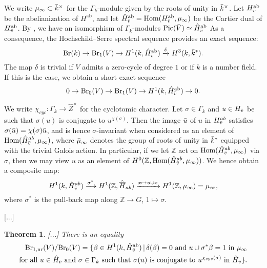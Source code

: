 \documentclass[10pt,letterpaper,twoside]{article}
\renewcommand{\1}{\mathbf{1}}
\newcommand{\nr}{\mathrm{nr}}
\newcommand{\Br}{\mathrm{Br}}
\theoremstyle{plain}
\newtheorem{theorem}{Theorem}[section]
\theoremstyle{plain}
\theoremstyle{definition}
\theoremstyle{named}
\theoremstyle{definition}
\begin{document}
	We write $\mu_{\infty}\subset \Bar{k}^\times$ for the $\Gamma_k$-module given by the roots of unity in $\Bar{k}^\times$. Let $H^{\mathrm{ab}}_{\Bar{v}}$ be the abelianization of  $H^{\mathrm{ab}}$, and let $\hat{H}^{\mathrm{ab}}_{\Bar{v}}= \mathrm{Hom}(H^{\mathrm{ab}}_{\Bar{v}}, \mu_{\infty})$ be the Cartier dual of $H^{\mathrm{ab}}_{\Bar{v}}$. By \cite{}, we have an isomorphism of $\Gamma_k$-modules $\text{Pic}(\Bar{V})\simeq \hat{H}^{\mathrm{ab}}_{\Bar{v}}$ As a consequence, the Hochschild–Serre spectral sequence provides an exact sequence:
	\[
	\text{Br}(k) \to \text{Br}_1(V) \to H^1(k, \hat{H}^{\mathrm{ab}}_{\Bar{v}}) \xrightarrow{\delta} H^3(k, \bar{k}^*).
	\]
	The map $\delta$ is trivial if $V$ admits a zero-cycle of degree $1$ or if $k$ is a number field. If this is the case, we obtain a short exact sequence
	\[0\to \Br_0(V)\to \Br_1(V)\to H^1(k, \hat{H}^{\mathrm{ab}}_{\Bar{v}})\to 0.\]
	
	
	We write $\chi_{cyc}:\Gamma_k\to \hat{Z}^\times$ for the cyclotomic character. Let $\sigma \in \Gamma_k$ and $u \in H_{\Bar{v}}$ be such that $\sigma(u)$ is conjugate to $u^{\chi(\sigma)}$. Then the image $\Bar{u}$ of $u$ in $H^{ab}_{\Bar{v}}$ satisfies $\sigma(\Bar{u}) = \chi(\sigma)\Bar{u}$, and is hence $\sigma$-invariant when considered as an element of $\text{Hom}(\hat{H}^{ab}_{\Bar{v}}, \mu_\infty)$, where $\Bar{\mu}_\infty$ denotes the group of roots of unity in $\Bar{k}^*$ equipped with the trivial Galois action. In particular, if we let $\mathbb{Z}$ act on $\text{Hom}(\hat{H}^{ab}_{\Bar{v}}, \mu_\infty)$ via $\sigma$, then we may view $u$ as an element of $H^0(\mathbb{Z}, \text{Hom}(\hat{H}^{ab}_{\Bar{v}}, \mu_\infty))$. We hence obtain a composite map:
	\[
	H^1(k, \hat{H}^{ab}_{\Bar{v}}) \xrightarrow{\sigma^*} H^1(\mathbb{Z}, \hat{\overline{H}}_{ab}) \xrightarrow{x \mapsto u \cup x} H^1(\mathbb{Z}, \mu_\infty) = \mu_\infty,
	\]
	where $\sigma^*$ is the pull-back map along $\mathbb{Z} \rightarrow G$, $1 \mapsto \sigma$.
	
	[...]
	
	
	\begin{theorem}\label{brauer-homogeneous}[...]
		There is an equality
		\begin{align*}
			\Br_{1,\nr}(V)/\Br_0(V) = \{\beta \in H^1(k, \hat{H}^{\mathrm{ab}}_{\Bar{v}}) \,|\, \delta(\beta) = 0 \text{ and } u \cup \sigma^*\beta = 1 \text{ in $\mu_\infty$}\\
			\text{for all $u \in \hat{H}_{\Bar{v}}$ and $\sigma \in \Gamma_k$ such that $\sigma(u)$ is conjugate to $u^{\chi_{cyc}(\sigma)}$ in $\hat{H}_{\Bar{v}}$}\}.
		\end{align*}
	\end{theorem}
	
\end{document}
